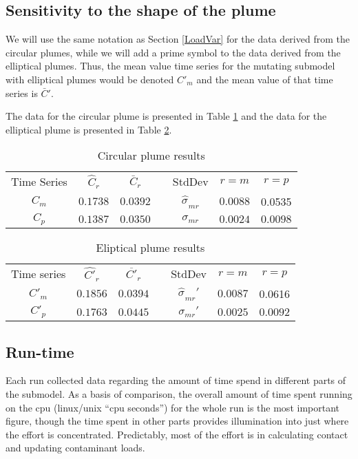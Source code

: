 \documentclass{article}
\begin{document}
\subsection{Sensitivity to the shape of the plume}

We will use the same notation as Section \ref{LoadVar} for the data derived
from the circular plumes, while we will add a prime symbol to the data derived
from the elliptical plumes. Thus, the mean value time series for the mutating
submodel with elliptical plumes would be denoted $C'_m$ and the mean value of
that time series is $\bar{C}'$.

The data for the circular plume is presented in Table \ref{Symplume} and the
data for the elliptical plume is presented in Table \ref{Asymplume}.

\begin{table}[h]
  \begin{tabular}{ccccccc}
    Time Series & $\hat{C}_r$ & $\bar{C}_r$ &  & StdDev & $r = m$ & $r = p$\\
    $C_m$ & $0.1738$ & $0.0392$ &  & $\widehat{\sigma_{}}_{m r}$ & $0.0088$ &
    0.0535\\
    $C_p$ & $0.1387$ & $0.0350$ &  & $\sigma_{m r}$ & $0.0024$ & $0.0098$
  \end{tabular}
  \caption{Circular plume results\label{Symplume}}
\end{table}

\begin{table}[h]
  \begin{tabular}{ccccccc}
    Time series & $\widehat{C'}_r$ & $\overline{C'}_r$ &  & StdDev & $r = m$ &
    $r = p$\\
    $C'_m$ & $0.1856$ & $0.0394$ &  & $\widehat{\sigma_{}}_{m r}'$ & $0.0087$
    & 0.0616\\
    $C'_p$ & $0.1763$ & $0.0445$ &  & $\sigma_{m r}'$ & $0.0025$ & $0.0092$
  \end{tabular}
  \caption{Eliptical plume results\label{Asymplume}}
\end{table}

\subsection{Run-time}

Each run collected data regarding the amount of time spend in different parts
of the submodel. As a basis of comparison, the overall amount of time spent
running on the cpu (linux/unix ``cpu seconds'') for the whole run is the most
important figure, though the time spent in other parts provides illumination
into just where the effort is concentrated. Predictably, most of the effort is
in calculating contact and updating contaminant loads.
\end{document}

